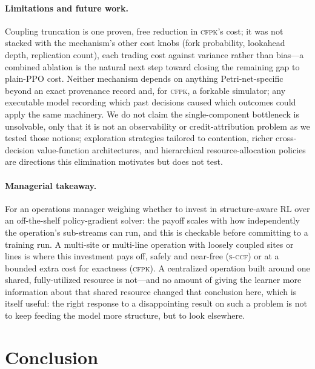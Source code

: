 \documentclass[review,authoryear,3p,times]{elsarticle}
\newcommand{\sccf}{\textsc{s-ccf}}
\newcommand{\cfpk}{\textsc{cfpk}}
\begin{document}
\paragraph{Limitations and future work.} Coupling truncation is one proven,
free reduction in \cfpk's cost; it was not stacked with the mechanism's other
cost knobs (fork probability, lookahead depth, replication count), each
trading cost against variance rather than bias---a combined ablation is the
natural next step toward closing the remaining gap to plain-PPO cost.
Neither mechanism depends on anything Petri-net-specific beyond an exact
provenance record and, for \cfpk, a forkable simulator; any executable model
recording which past decisions caused which outcomes could apply the same
machinery. We do not claim the single-component bottleneck is unsolvable,
only that it is not an observability or credit-attribution problem as we
tested those notions; exploration strategies tailored to contention, richer
cross-decision value-function architectures, and hierarchical
resource-allocation policies are directions this elimination motivates but
does not test.

\paragraph{Managerial takeaway.} For an operations manager weighing whether
to invest in structure-aware RL over an off-the-shelf policy-gradient solver:
the payoff scales with how independently the operation's sub-streams can run,
and this is checkable before committing to a training run. A multi-site or
multi-line operation with loosely coupled sites or lines is where this
investment pays off, safely and near-free (\sccf) or at a bounded extra cost
for exactness (\cfpk). A centralized operation built around one shared,
fully-utilized resource is not---and no amount of giving the learner more
information about that shared resource changed that conclusion here, which
is itself useful: the right response to a disappointing result on such a
problem is not to keep feeding the model more structure, but to look
elsewhere.

\section{Conclusion}
\label{sec:conclusion}
\end{document}
